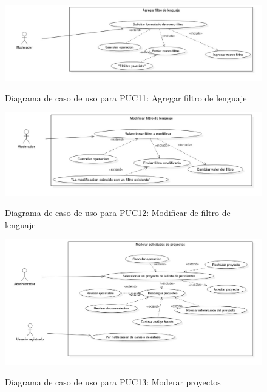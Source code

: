 \begin{figure}[!ht]
\includegraphics[width=\textwidth]{images/usecase/PUC11} %
\label{FIG:CU_PUC11}
\caption{Diagrama de caso de uso para PUC11: Agregar filtro de lenguaje}
\end{figure}

\begin{figure}[!ht]
\includegraphics[width=\textwidth]{images/usecase/PUC12} %
\label{FIG:CU_PUC12}
\caption{Diagrama de caso de uso para PUC12: Modificar de filtro de lenguaje}
\end{figure}

\begin{figure}[!ht]
\includegraphics[width=\textwidth]{images/usecase/PUC13}
\label{FIG:CU_PUC13}
\caption{Diagrama de caso de uso para PUC13: Moderar proyectos}
\end{figure}

